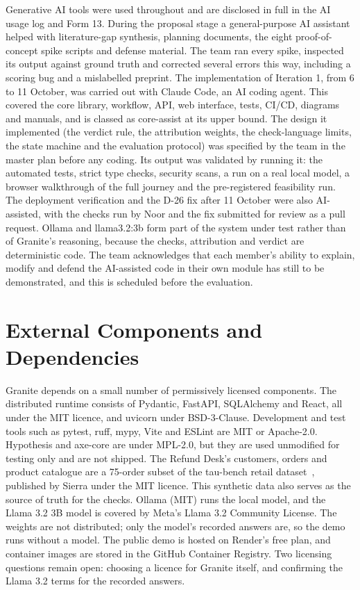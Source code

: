 Generative AI tools were used throughout and are disclosed in full in the AI usage log and Form 13. During the proposal stage a general-purpose AI assistant helped with literature-gap synthesis, planning documents, the eight proof-of-concept spike scripts and defense material. The team ran every spike, inspected its output against ground truth and corrected several errors this way, including a scoring bug and a mislabelled preprint. The implementation of Iteration 1, from 6 to 11 October, was carried out with Claude Code, an AI coding agent. This covered the core library, workflow, API, web interface, tests, CI/CD, diagrams and manuals, and is classed as core-assist at its upper bound. The design it implemented (the verdict rule, the attribution weights, the check-language limits, the state machine and the evaluation protocol) was specified by the team in the master plan before any coding. Its output was validated by running it: the automated tests, strict type checks, security scans, a run on a real local model, a browser walkthrough of the full journey and the pre-registered feasibility run. The deployment verification and the D-26 fix after 11 October were also AI-assisted, with the checks run by Noor and the fix submitted for review as a pull request. Ollama and llama3.2:3b form part of the system under test rather than of Granite's reasoning, because the checks, attribution and verdict are deterministic code. The team acknowledges that each member's ability to explain, modify and defend the AI-assisted code in their own module has still to be demonstrated, and this is scheduled before the evaluation.

\section{External Components and Dependencies}

Granite depends on a small number of permissively licensed components. The distributed runtime consists of Pydantic, FastAPI, SQLAlchemy and React, all under the MIT licence, and uvicorn under BSD-3-Clause. Development and test tools such as pytest, ruff, mypy, Vite and ESLint are MIT or Apache-2.0. Hypothesis and axe-core are under MPL-2.0, but they are used unmodified for testing only and are not shipped. The Refund Desk's customers, orders and product catalogue are a 75-order subset of the tau-bench retail dataset~\cite{taubench}, published by Sierra under the MIT licence. This synthetic data also serves as the source of truth for the checks. Ollama (MIT) runs the local model, and the Llama 3.2 3B model is covered by Meta's Llama 3.2 Community License. The weights are not distributed; only the model's recorded answers are, so the demo runs without a model. The public demo is hosted on Render's free plan, and container images are stored in the GitHub Container Registry. Two licensing questions remain open: choosing a licence for Granite itself, and confirming the Llama 3.2 terms for the recorded answers.

